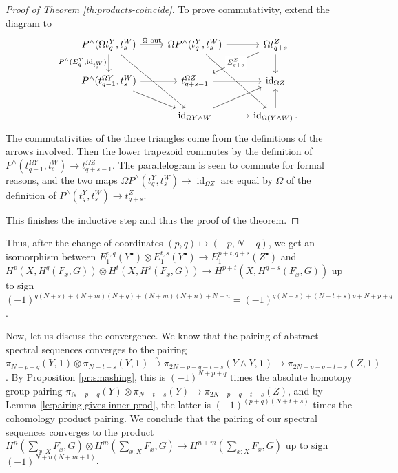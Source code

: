 \documentclass{amsart}
\theoremstyle{definition}
\newcommand{\tot}[2]{\sum\limits_{#1}^{}{#2}}
\newcommand{\oout}{\operatorname{\Omega-out}}
\newcommand{\sgtn}{\mathbf{1}}
\begin{document}
\begin{proof}[Proof of Theorem \ref{th:products-coincide}]
    To prove commutativity, extend the diagram to
    \[\begin{tikzcd}
    	{P^\wedge(\Omega  t_q^Y, t_s^W)} & {\Omega P^\wedge(t_q^Y, t_s^W)} & {\Omega t^Z_{q+s}} \\
    	{P^\wedge(t_{q-1}^{\Omega Y}, t_s^W)} & {t^{\Omega Z}_{q+s-1}} & {\operatorname{id}_{\Omega Z}} \\
    	& {\operatorname{id}_{\Omega Y \wedge W}} & {\operatorname{id}_{\Omega (Y \wedge W)}.}
    	\arrow["\oout", from=1-1, to=1-2]
    	\arrow["{P^\wedge ({E}^Y_{q}, \operatorname{id}_{t^W_s})}"', from=1-1, to=2-1]
    	\arrow[from=1-1, to=3-2]
    	\arrow[from=1-2, to=1-3]
    	\arrow[from=1-2, to=3-3]
    	\arrow["{{E}^Z_{q+s}}"{description}, from=1-3, to=2-2]
    	\arrow[from=1-3, to=2-3]
    	\arrow[from=2-1, to=2-2]
    	\arrow[from=2-1, to=3-2]
    	\arrow[from=2-2, to=2-3]
    	\arrow[from=3-2, to=2-3]
    	\arrow[from=3-2, to=3-3]
    	\arrow[from=3-3, to=2-3]
    \end{tikzcd}\]
    The commutativities of the three triangles come from the definitions of the arrows involved. Then the lower trapezoid commutes by the definition of $P^\wedge(t_{q-1}^{\Omega Y}, t_s^W) \to t^{\Omega Z}_{q+s-1}$. The parallelogram is seen to commute for formal reasons, and the two maps $\Omega P^\wedge(t_q^Y, t_s^W) \to \operatorname{id}_{\Omega Z}$ are equal by $\Omega$ of the definition of $P^\wedge(t_q^Y, t_s^W) \to t^Z_{q+s}$.

    This finishes the inductive step and thus the proof of the theorem.
\end{proof}

Thus, after the change of coordinates $(p, q) \mapsto (-p, N-q)$, we get an isomorphism between $E_1^{p,q}(Y^{\bullet}) \otimes E_1^{t,s}(Y^{\bullet}) \to E_1^{p+t,q+s}(Z^{\bullet})$ and $H^{p}(X , H^q(F_x, G)) \otimes H^{t}(X , H^s(F_x, G)) \to H^{p+t}(X , H^{q+s}(F_x, G))$ up to sign $(-1)^{q(N+s)+(N+m)(N+q) + (N+m)(N+n) + N+n} = (-1)^{q(N+s)+(N+t+s)p + N+p+q}$.

Now, let us discuss the convergence. We know that the pairing of abstract spectral sequences converges to the pairing $\pi_{N-p-q}(Y, \sgtn) \otimes \pi_{N-t-s}(Y, \sgtn) \xrightarrow{\circ} \pi_{2N-p-q-t-s}(Y \wedge Y, \sgtn) \to \pi_{2N-p-q-t-s}(Z, \sgtn)$. By Proposition \ref{pr:smashing}, this is
$(-1)^{N+p+q}$
times the absolute homotopy group pairing $\pi_{N-p-q}(Y) \otimes \pi_{N-t-s}(Y) \to \pi_{2N-p-q-t-s}(Z)$, and by Lemma \ref{le:pairing-gives-inner-prod}, the latter is
$(-1)^{(p+q)(N+t+s)}$
times the cohomology product pairing. We conclude that
the pairing of our spectral sequences converges to the product $H^{n}(\tot{x:X}{F_x}, G) \otimes H^{m}(\tot{x:X}{F_x}, G) \to H^{n+m}(\tot{x:X}{F_x}, G)$ up to sign $(-1)^{N+n(N+m+1)}$.
\end{document}
